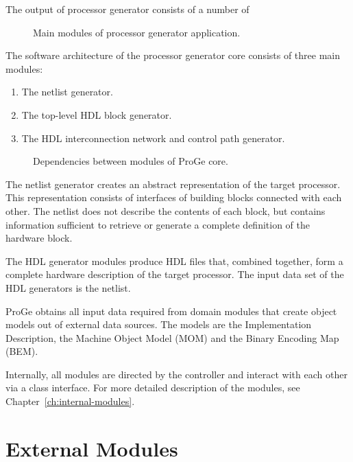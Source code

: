 \documentclass[a4paper,twoside]{tce}
\begin{document}
The output of processor generator consists of a number of

\begin{figure}[tb]
\centerline{}
\caption{Main modules of processor generator application.}
\label{fig:overview}
\end{figure}

The software architecture of the processor generator core consists of three
main modules:
\begin{enumerate}
\item%
  The netlist generator.
\item%
  The top-level HDL block generator.
\item%
  The HDL interconnection network and control path generator.
\end{enumerate}

\begin{figure}[tb]
\centerline{}
\caption{Dependencies between modules of ProGe core.}
\label{fig:module-dependencies}
\end{figure}

The netlist generator creates an abstract representation of the target
processor. This representation consists of interfaces of building blocks
connected with each other. The netlist does not describe the contents of
each block, but contains information sufficient to retrieve or generate a
complete definition of the hardware block.

The HDL generator modules produce HDL files that, combined together, form a
complete hardware description of the target processor. The input data set of
the HDL generators is the netlist.

ProGe obtains all input data required from domain modules that create object
models out of external data sources. The models are the Implementation
Description, the Machine Object Model (MOM) and the Binary Encoding Map
(BEM).

Internally, all modules are directed by the controller and interact with
each other via a class interface.  For more detailed description of the
modules, see Chapter~\ref{ch:internal-modules}.

\section{External Modules}
\label{sec:external-modules}

\end{document}

